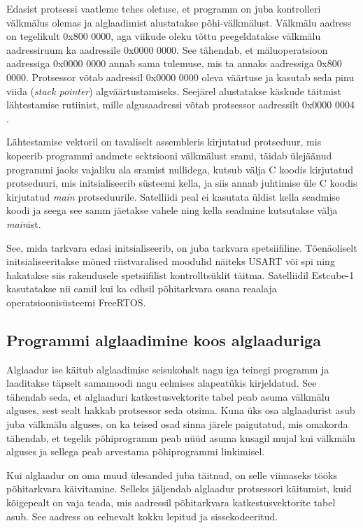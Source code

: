 \documentclass[12pt,a4paper]{article}
\begin{document}
Edasist protsessi vaatleme tehes oletuse, et programm on juba kontrolleri
välkmälus olemas ja alglaadimist alustatakse põhi-välkmälust. Välkmälu aadress
on tegelikult 0x800 0000, aga viikude oleku tõttu peegeldatakse välkmälu
aadressiruum ka aadressile 0x0000 0000. See tähendab, et mäluoperatsioon
aadressiga 0x0000 0000 annab sama tulemuse, mis ta annaks aadressiga 0x800 0000.
Protsessor võtab aadressil 0x0000 0000 oleva väärtuse ja kasutab seda pinu viida
(\textit{stack pointer}) algväärtustamiseks. Seejärel alustatakse käskude
täitmist lähtestamise rutiinist, mille algusaadressi võtab protsessor aadressilt
0x0000 0004 \cite{f1rm}.

Lähtestamise vektoril on tavaliselt assembleris kirjutatud protseduur, mis
kopeerib programmi andmete sektsiooni välkmälust \gls{sram}i, täidab ülejäänud
programmi jaoks vajaliku ala \gls{sram}ist nullidega, kutsub välja C koodis
kirjutatud protseduuri, mis initsialiseerib süsteemi kella, ja siis annab
juhtimise üle C koodis kirjutatud \textit{main} protseduurile. Satelliidi peal
ei kasutata üldist kella seadmise koodi ja seega see samm jäetakse vahele ning
kella seadmine kutsutakse välja \textit{main}ist.

See, mida tarkvara edasi initsialiseerib, on juba tarkvara spetsiifiline.
Tõenäoliselt initsialiseeritakse mõned riistvaralised moodulid näiteks USART või
\gls{spi} ning hakatakse siis rakendusele spetsiifilist kontrolltsüklit täitma.
Satelliidil Estcube-1 kasutatakse nii \gls{cam}il kui ka \gls{cdhs}il
põhitarkvara osana reaalaja operatsioonisüsteemi FreeRTOS.

\subsection{Programmi alglaadimine koos alglaaduriga}
Alglaadur ise käitub alglaadimise seisukohalt nagu iga teinegi programm ja
laaditakse täpselt samamoodi nagu eelmises alapeatükis kirjeldatud. See tähendab
seda, et alglaaduri katkestusvektorite tabel peab asuma välkmälu alguses, sest
sealt hakkab protsessor seda otsima. Kuna üks osa alglaadurist asub juba
välkmälu alguses, on ka teised osad sinna järele paigutatud, mis omakorda
tähendab, et tegelik põhiprogramm peab nüüd asuma kusagil mujal kui välkmälu
alguses ja sellega peab arvestama põhiprogrammi linkimisel.

Kui alglaadur on oma muud ülesanded juba täitnud, on selle viimaseks tööks
põhitarkvara käivitamine. Selleks jäljendab alglaadur protsessori käitumist,
kuid kõigepealt on vaja teada, mis aadressil põhitarkvara katkestusvektorite
tabel asub. See aadress on eelnevalt kokku lepitud ja sissekodeeritud.
\end{document}
